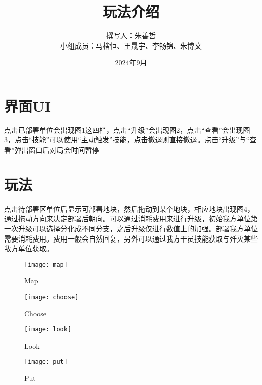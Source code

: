 \documentclass[a4paper,12pt]{article}
\begin{document}
	\title{玩法介绍}
	\author{撰写人：朱善哲\\小组成员：马楷恒、王晟宇、李畅锦、朱博文}
	\date{2024年9月}
	\maketitle
	\section{界面UI}
		
		点击已部署单位会出现图1这四栏，点击“升级”会出现图2，点击“查看”会出现图3，点击“技能”可以使用“主动触发”技能，点击撤退则直接撤退。点击“升级”与“查看”弹出窗口后对局会时间暂停
	\section{玩法}
		点击待部署区单位后显示可部署地块，然后拖动到某个地块，相应地块出现图4，通过拖动方向来决定部署后朝向。可以通过消耗费用来进行升级，初始我方单位第一次升级可以选择分化成不同分支，之后升级仅进行数值上的加强。部署我方单位需要消耗费用。费用一般会自然回复，另外可以通过我方干员技能获取与歼灭某些敌方单位获取。
	\begin{figure}[p]
		\centering
		\texttt{[image: map]}
		\caption{Map}
	\end{figure}
	\begin{figure}[p]
		\centering
		\texttt{[image: choose]}
		\caption{Choose}
	\end{figure}
	\begin{figure}[p]
		\centering
		\texttt{[image: look]}
		\caption{Look}
	\end{figure}
	\begin{figure}[p]
		\centering
		\texttt{[image: put]}
		\caption{Put}
	\end{figure}
\end{document}
